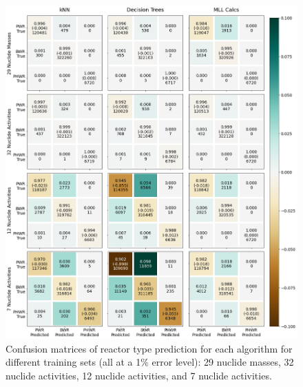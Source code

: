 \begin{figure}[!htbp]
  \centering
  \includegraphics[width=\textwidth]{./chapters/exp2/confusion_matrix_nucs_acts.png}
  \caption[Confusion matrices of reactor type classification for non-detector 
           training sets]
          {Confusion matrices of reactor type prediction for each algorithm 
           for different training sets (all at a 1\% error level): 29 nuclide 
           masses, 32 nuclide activities, 12 nuclide activities, and 7 nuclide 
           activities.}
  \label{fig:cm_nucs_acts}
\end{figure}

